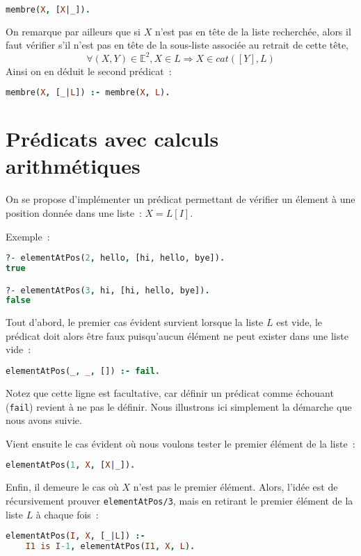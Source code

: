 \begin{lstlisting}[language=Prolog,frame=single]
membre(X, [X|_]).
\end{lstlisting}

On remarque par ailleurs que si $X$ n'est pas en tête de la liste recherchée, alors il faut vérifier s'il n'est pas en tête de la sous-liste associée au retrait de cette tête, 
\[\forall (X, Y) \in \mathbb{E}^2, X \in L \Rightarrow X \in cat([Y], L)\]
Ainsi on en déduit le second prédicat~:
\begin{lstlisting}[language=Prolog,frame=single]
membre(X, [_|L]) :- membre(X, L).
\end{lstlisting}


\section{Prédicats avec calculs arithmétiques}

On se propose d'implémenter un prédicat permettant de vérifier un élement à une
position donnée dans une liste~: $X = L[I]$.

Exemple~:
\begin{lstlisting}[language=Prolog,frame=single]
?- elementAtPos(2, hello, [hi, hello, bye]).
true

?- elementAtPos(3, hi, [hi, hello, bye]).
false
\end{lstlisting}


Tout d'abord, le premier cas évident survient lorsque la liste $L$ est vide, le
prédicat doit alors être faux puisqu'aucun élément ne peut exister dans une liste vide~:
\begin{lstlisting}[language=Prolog,frame=single]
elementAtPos(_, _, []) :- fail.
\end{lstlisting}
Notez que cette ligne est facultative, car définir un prédicat comme échouant
(\texttt{fail}) revient à ne pas le définir. Nous illustrons ici simplement la démarche que nous avons suivie.

Vient ensuite le cas évident où nous voulons tester le premier élément de la liste~:
\begin{lstlisting}[language=Prolog,frame=single]
elementAtPos(1, X, [X|_]).
\end{lstlisting}

Enfin, il demeure le cas où $X$ n'est pas le premier élément. Alors, l'idée est
de récursivement prouver \texttt{elementAtPos/3}, mais en retirant le premier élément de la liste $L$ à chaque fois~:
\begin{lstlisting}[language=Prolog,frame=single]
elementAtPos(I, X, [_|L]) :-
    I1 is I-1, elementAtPos(I1, X, L).
\end{lstlisting}

